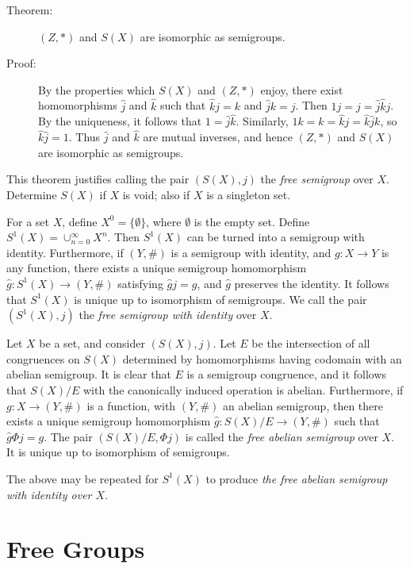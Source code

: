 \documentclass{article}
\begin{document}
\begin{description}

\item[Theorem:] $(Z,*)$ and $S(X)$ are isomorphic as semigroups.

\item[Proof:] By the properties which $S(X)$ and $(Z,*)$ enjoy, there exist homomorphisms $\hat{j}$ and $\hat{k}$ such that $\hat{k}j = k$ and $\hat{j}k = j$. Then $1j = j = \hat{j} \hat{k} j$. By the uniqueness, it follows that $1 = \hat{j} \hat{k}$. Similarly, $1k = k = \hat{k}j = \hat{k} \hat{j}k$, so $\hat{k} \hat{j} = 1$. Thus $\hat{j}$ and $\hat{k}$ are mutual inverses, and hence $(Z,*)$ and $S(X)$ are isomorphic as semigroups.

\end{description}

This theorem justifies calling the pair $(S(X),j)$ the \emph{free semigroup} over $X$. Determine $S(X)$ if $X$ is void; also if $X$ is a singleton set.

For a set $X$, define $X^0 = \{\emptyset\}$, where $\emptyset$ is the empty set. Define $S^1(X) = \cup_{n=0}^\infty X^n$. Then $S^1(X)$ can be turned into a semigroup with identity. Furthermore, if $(Y,\#)$ is a semigroup with identity, and $g: X \rightarrow Y$ is any function, there exists a unique semigroup homomorphism $\hat{g}: S^1(X) \rightarrow (Y,\#)$ satisfying $\hat{g}j=g$, and $\hat{g}$ preserves the identity. It follows that $S^1(X)$ is unique up to isomorphism of semigroups. We call the pair $(S^1(X),j)$ the \emph{free semigroup with identity} over $X$.

Let $X$ be a set, and consider $(S(X),j)$. Let $E$ be the intersection of all congruences on $S(X)$ determined by homomorphisms having codomain with an abelian semigroup. It is clear that $E$ is a semigroup congruence, and it follows that $S(X)/E$ with the canonically induced operation is abelian. Furthermore, if $g: X \rightarrow (Y,\#)$ is a function, with $(Y,\#)$ an abelian semigroup, then there exists a unique semigroup homomorphism $\hat{g}: S(X)/E \rightarrow (Y,\#)$ such that $\hat{g}{\Phi}j = g$. The pair $(S(X)/E,{\Phi}j)$ is called the \emph{free abelian semigroup} over $X$. It is unique up to isomorphism of semigroups.

The above may be repeated for $S^1(X)$ to produce \emph{the free abelian semigroup with identity over $X$}.



\section{Free Groups}
\end{document}

